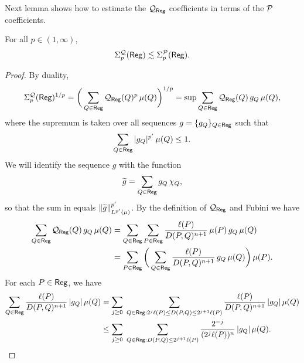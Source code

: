 \vv


Next lemma shows how to estimate the ${\mathcal Q}_{\mathsf{Reg}}$ coefficients in terms of the ${\mathcal P}$ coefficients.
\vv

\begin{lemma}\label{lemregpq}
For all $p\in(1,\infty)$,
$$\Sigma_p^{\mathcal Q}({\mathsf{Reg}})\lesssim \Sigma_p^{\mathcal P}({\mathsf{Reg}}).$$
\end{lemma}


\begin{proof}
By duality,
\begin{equation}\label{eqdual912}
\Sigma_p^{\mathcal Q}({\mathsf{Reg}})^{1/p} = \bigg(\sum_{Q\in{\mathsf{Reg}}}{\mathcal Q}_{\mathsf{Reg}}(Q)^p\,\mu(Q)\bigg)^{1/p}
= \sup \sum_{Q\in{\mathsf{Reg}}} {\mathcal Q}_{\mathsf{Reg}}(Q)\,g_Q\,\mu(Q),
\end{equation}
where the supremum is taken over all sequences $g=\{g_Q\}_{Q\in{\mathsf{Reg}}}$ such that 
\begin{equation}\label{eqdual912b}
\sum_{Q\in{\mathsf{Reg}}} |g_Q|^{p'}\,\mu(Q)\leq1.
\end{equation}
We will identify the sequence $g$ with the function 
$${\widetilde{g}}= \sum_{Q\in{\mathsf{Reg}}}g_Q\,\chi_Q,$$
so that the sum in  equals $\|{\widetilde{g}} \|_{L^{p'}(\mu)}^{p'}$.
 By the definition of ${\mathcal Q}_{\mathsf{Reg}}$ and Fubini we have
\begin{align}\label{eqdjkq44}
\sum_{Q\in{\mathsf{Reg}}} {\mathcal Q}_{\mathsf{Reg}}(Q)\,g_Q\,\mu(Q) &= \sum_{Q\in{\mathsf{Reg}}} \sum_{P\in{\mathsf{Reg}}} \frac{\ell(P)}{D(P,Q)^{n+1}}\,\mu(P)\,g_Q\,\mu(Q)\\
& = \sum_{P\in{\mathsf{Reg}}} \bigg( \sum_{Q\in{\mathsf{Reg}}} \frac{\ell(P)}{D(P,Q)^{n+1}}\,g_Q\,\mu(Q)\bigg)\,\mu(P).
\nonumber
\end{align}
For each $P\in{\mathsf{Reg}}$, we have
\begin{align}\label{eqalg539}
\sum_{Q\in{\mathsf{Reg}}} \frac{\ell(P)}{D(P,Q)^{n+1}}\,|g_Q|\,\mu(Q) & = \sum_{j\geq0}\;
\sum_{Q\in{\mathsf{Reg}}:2^j\ell(P)\leq D(P,Q)\leq 2^{j+1}\ell(P)} \frac{\ell(P)}{D(P,Q)^{n+1}}\,|g_Q|\,\mu(Q)\\
& \leq \sum_{j\geq0}\;
\sum_{Q\in{\mathsf{Reg}}:D(P,Q)\leq 2^{j+1}\ell(P)} \frac{2^{-j}}{(2^j\ell(P))^{n}}\,|g_Q|\,\mu(Q).\nonumber
\end{align}


\end{proof}
